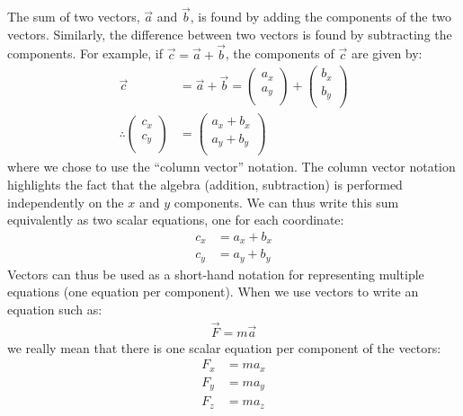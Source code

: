 The sum of two vectors, $\vec a$ and $\vec b$, is found by adding the components of the two vectors. Similarly, the difference between two vectors is found by subtracting the components. For example, if $\vec c=\vec a+\vec b$, the components of $\vec c$ are given by:
\begin{align*}
\vec c &= \vec a + \vec b = \begin{pmatrix}
           a_x \\
           a_y \\
         \end{pmatrix} + \begin{pmatrix}
           b_x \\
           b_y \\
         \end{pmatrix}\\
        \therefore \begin{pmatrix}
           c_x \\
           c_y \\
         \end{pmatrix} &=\begin{pmatrix}
           a_x+b_x \\
           a_y+b_y \\
         \end{pmatrix}
\end{align*}
where we chose to use the ``column vector'' notation. The column vector notation highlights the fact that the algebra (addition, subtraction) is performed independently on the $x$ and $y$ components. We can thus write this sum equivalently as two scalar equations, one for each coordinate:
\begin{align*}
c_x &= a_x+b_x\\
c_y &= a_y+b_y
\end{align*}
Vectors can thus be used as a short-hand notation for representing multiple equations (one equation per component). When we use vectors to write an equation such as:
\begin{align*}
\vec F = m\vec a
\end{align*}
we really mean that there is one scalar equation per component of the vectors:
\begin{align*}
F_x &= ma_x\\
F_y &= ma_y\\
F_z &= ma_z
\end{align*}

